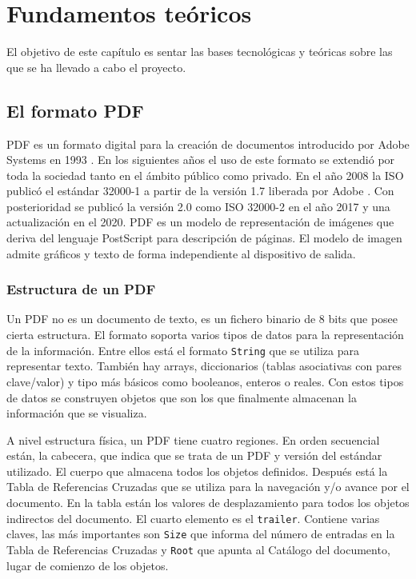 
\chapter{Fundamentos teóricos}
\label{chap:fundamentos-teoricos}

El objetivo de este capítulo es sentar las bases tecnológicas y teóricas sobre las que se ha llevado a cabo el proyecto.

\section{El formato PDF}

PDF es un formato digital para la creación de documentos introducido por Adobe Systems en 1993 \cite{adobe_systems_inc_quick_2010,canonicalltd.UbuntuManpagePdfinfo}. En los siguientes años el uso de este formato se extendió por toda la sociedad tanto en el ámbito público como privado. En el año 2008 la ISO publicó el estándar 32000-1 a partir de la versión 1.7 liberada por Adobe \cite{adobe_systems_inc_iso_2008}. Con posterioridad se publicó la versión 2.0 como ISO 32000-2 \cite{international_organization_for_standardization_iso_2017} en el año 2017 y una actualización en el 2020. PDF es un modelo de representación de imágenes que deriva del lenguaje PostScript para descripción de páginas. El modelo de imagen admite gráficos y texto de forma independiente al dispositivo de salida.

\subsection{Estructura de un PDF}

Un PDF no es un documento de texto, es un fichero binario de 8 bits que posee cierta estructura. El formato soporta varios tipos de datos para la representación de la información. Entre ellos está el formato \verb|String| que se utiliza para representar texto. También hay arrays, diccionarios (tablas asociativas con pares clave/valor) y tipo más básicos como booleanos, enteros o reales. Con estos tipos de datos se construyen objetos que son los que finalmente almacenan la información que se visualiza.

A nivel estructura física, un PDF tiene cuatro regiones. En orden secuencial están, la cabecera, que indica que se trata de un PDF y versión del estándar utilizado. El cuerpo que almacena todos los objetos definidos. Después está la Tabla de Referencias Cruzadas que se utiliza para la navegación y/o avance por el documento. En la tabla están los valores de desplazamiento para todos los objetos indirectos del documento. El cuarto elemento es el \verb|trailer|. Contiene varias claves, las más importantes son \verb|Size| que informa del número de entradas en la Tabla de Referencias Cruzadas y \verb|Root| que apunta al Catálogo del documento, lugar de comienzo de los objetos.

